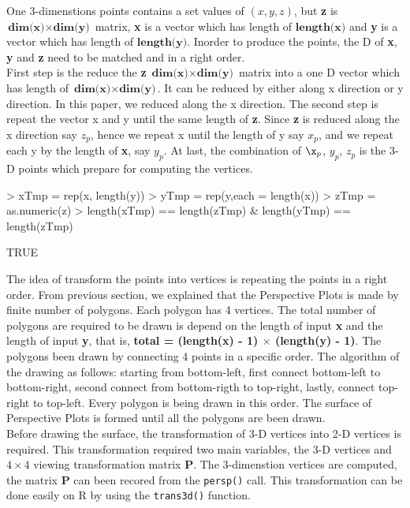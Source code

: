 \documentclass[paper=a4, fontsize=11pt]{report}
\begin{document}
One 3-dimenstions points contains a set values of $(x, y, z)$, but \textbf{z} is $\textbf{dim(x)} \times \textbf{dim(y)}$ matrix, \textbf{x} is a vector which has length of $\textbf{length(x)}$ and \textbf{y} is a vector which has length of $\textbf{length(y)}$. Inorder to produce the points, the D of \textbf{x}, \textbf{y} and \textbf{z} need to be matched and in a right order.\\

First step is the reduce the \textbf{z} $\textbf{dim(x)} \times \textbf{dim(y)}$ matrix into a one D vector which has length of $\textbf{dim(x)} \times \textbf{dim(y)}$. It can be reduced by either along x direction or y direction. In this paper, we reduced along the x direction. The second step is repeat the vector x and y until the same length of \textbf{z}. Since \textbf{z} is reduced along the x direction say $z_p$, hence we repeat x until the length of y say $x_p$, and we repeat each y by the length of \textbf{x}, say $y_p$. At last, the combination of $\x_p$, $y_p$, $z_p$ is the 3-D points which prepare for computing the vertices. \\
\begin{Schunk}
\begin{Sinput}
> xTmp = rep(x, length(y))
> yTmp = rep(y,each = length(x))
> zTmp = as.numeric(z)
> length(xTmp) == length(zTmp) & length(yTmp) == length(zTmp)
\end{Sinput}
\begin{Soutput}
[1] TRUE
\end{Soutput}
\end{Schunk}

The idea of transform the points into vertices is repeating the points in a right order. From previous section, we explained that the Perspective Plots is made by finite number of polygons. Each polygon has 4 vertices. The total number of polygons are required to be drawn is depend on the length of input \textbf{x} and the length of input \textbf{y}, that is, \textbf{total = (length(x) - 1) $\times$ (length(y) - 1)}. The polygons been drawn by connecting 4 points in a specific order. The algorithm of the drawing as follows: starting from bottom-left, first connect bottom-left to bottom-right, second connect from bottom-rigth to top-right, lastly, connect top-right to top-left. Every polygon is being drawn in this order. The surface of Perspective Plots is formed until all the polygons are been drawn. \\

Before drawing the surface, the transformation of 3-D vertices into 2-D vertices is required. This transformation required two main variables, the 3-D vertices and $4 \times 4$ viewing transformation matrix \textbf{P}. The 3-dimenstion vertices are computed, the matrix \textbf{P} can been recored from the \texttt{persp()} call. This transformation can be done easily on R by using the \texttt{trans3d()} function.
\end{document}
